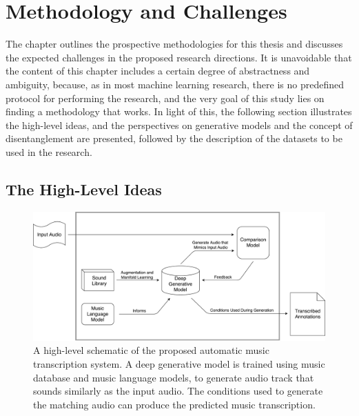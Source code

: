 
\graphicspath{{4-methods/figures/}}
\chapter{Methodology and Challenges}
\label{ch:methods}

The chapter outlines the prospective methodologies for this thesis and discusses the expected challenges in the proposed research directions.
It is unavoidable that the content of this chapter includes a certain degree of abstractness and ambiguity, because, as in most machine learning research, there is no predefined protocol for performing the research, and the very goal of this study lies on finding a methodology that works.
In light of this, the following section illustrates the high-level ideas, and the perspectives on generative models and the concept of disentanglement are presented, followed by the description of the datasets to be used in the research.


\section{The High-Level Ideas}

\begin{figure}
	\includegraphics[width=\textwidth]{grand.pdf}
	\caption{A high-level schematic of the proposed automatic music transcription system. A deep generative model is trained using music database and music language models, to generate audio track that sounds similarly as the input audio. The conditions used to generate the matching audio can produce the predicted music transcription. }\label{fig:grand}
\end{figure}

